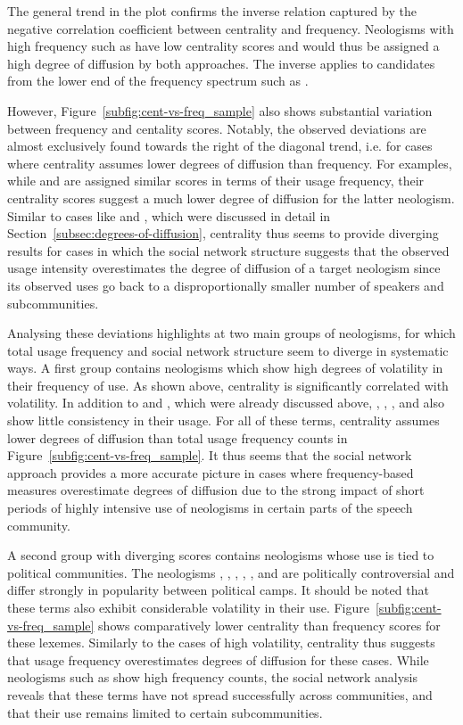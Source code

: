 \documentclass[
  a4paper,
  abstract=on,
  captions=tableabove
  ]{scrartcl}
\begin{document}
      The general trend in the plot confirms the inverse relation captured by the negative correlation coefficient between centrality and frequency. Neologisms with high frequency such as  have low centrality scores and would thus be assigned a high degree of diffusion by both approaches. The inverse applies to candidates from the lower end of the frequency spectrum such as .

      However, Figure~\ref{subfig:cent-vs-freq_sample} also shows substantial variation between frequency and centality scores. Notably, the observed deviations are almost exclusively found towards the right of the diagonal trend, i.e. for cases where centrality assumes lower degrees of diffusion than frequency. For examples, while  and  are assigned similar scores in terms of their usage frequency, their centrality scores suggest a much lower degree of diffusion for the latter neologism. Similar to cases like  and , which were discussed in detail in Section~\ref{subsec:degrees-of-diffusion}, centrality thus seems to provide diverging results for cases in which the social network structure suggests that the observed usage intensity overestimates the degree of diffusion of a target neologism since its observed uses go back to a disproportionally smaller number of speakers and subcommunities.

      Analysing these deviations highlights at two main groups of neologisms, for which total usage frequency and social network structure seem to diverge in systematic ways. A first group contains neologisms which show high degrees of volatility in their frequency of use. As shown above, centrality is significantly correlated with volatility. In addition to  and , which were already discussed above, , , , and  also show little consistency in their usage. For all of these terms, centrality assumes lower degrees of diffusion than total usage frequency counts in Figure~\ref{subfig:cent-vs-freq_sample}. It thus seems that the social network approach provides a more accurate picture in cases where frequency-based measures overestimate degrees of diffusion due to the strong impact of short periods of highly intensive use of neologisms in certain parts of the speech community.

      A second group with diverging scores contains neologisms whose use is tied to political communities. The neologisms , , , , , and  are politically controversial and differ strongly in popularity between political camps. It should be noted that these terms also exhibit considerable volatility in their use. Figure~\ref{subfig:cent-vs-freq_sample} shows comparatively lower centrality than frequency scores for these lexemes. Similarly to the cases of high volatility, centrality thus suggests that usage frequency overestimates degrees of diffusion for these cases. While neologisms such as  show high frequency counts, the social network analysis reveals that these terms have not spread successfully across communities, and that their use remains limited to certain subcommunities.
\end{document}
